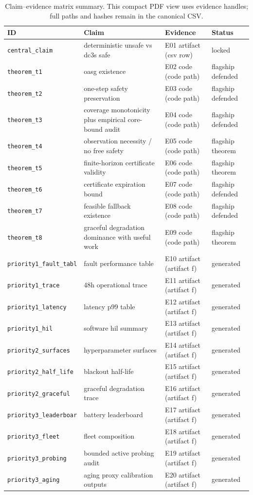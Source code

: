 \begin{table}[htbp]
\centering
\scriptsize
\caption{Claim--evidence matrix summary. This compact PDF view uses evidence handles; full paths and hashes remain in the canonical CSV.}
\label{tab:claim_evidence}
\begin{tabularx}{\textwidth}{@{}p{}X p{}p{}@{}}
\toprule
ID & Claim & Evidence & Status \\
\midrule
\texttt{central\_claim} & deterministic unsafe vs dc3s safe & E01 artifact (csv row) & locked \\
\texttt{theorem\_t1} & oasg existence & E02 code (code path) & flagship defended \\
\texttt{theorem\_t2} & one-step safety preservation & E03 code (code path) & flagship defended \\
\texttt{theorem\_t3} & coverage monotonicity plus empirical core-bound audit & E04 code (code path) & flagship defended \\
\texttt{theorem\_t4} & observation necessity / no free safety & E05 code (code path) & flagship theorem \\
\texttt{theorem\_t5} & finite-horizon certificate validity & E06 code (code path) & flagship theorem \\
\texttt{theorem\_t6} & certificate expiration bound & E07 code (code path) & flagship defended \\
\texttt{theorem\_t7} & feasible fallback existence & E08 code (code path) & flagship defended \\
\texttt{theorem\_t8} & graceful degradation dominance with useful work & E09 code (code path) & flagship theorem \\
\texttt{priority1\_fault\_tabl} & fault performance table & E10 artifact (artifact f) & generated \\
\texttt{priority1\_trace} & 48h operational trace & E11 artifact (artifact f) & generated \\
\texttt{priority1\_latency} & latency p99 table & E12 artifact (artifact f) & generated \\
\texttt{priority1\_hil} & software hil summary & E13 artifact (artifact f) & generated \\
\texttt{priority2\_surfaces} & hyperparameter surfaces & E14 artifact (artifact f) & generated \\
\texttt{priority2\_half\_life} & blackout half-life & E15 artifact (artifact f) & generated \\
\texttt{priority2\_graceful} & graceful degradation trace & E16 artifact (artifact f) & generated \\
\texttt{priority3\_leaderboar} & battery leaderboard & E17 artifact (artifact f) & generated \\
\texttt{priority3\_fleet} & fleet composition & E18 artifact (artifact f) & generated \\
\texttt{priority3\_probing} & bounded active probing audit & E19 artifact (artifact f) & generated \\
\texttt{priority3\_aging} & aging proxy calibration outputs & E20 artifact (artifact f) & generated \\
\bottomrule
\end{tabularx}
\end{table}